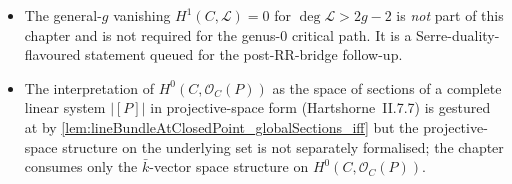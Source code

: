 \begin{itemize}
    chapter supplies the basis \((1, f)\) and stops.
  \item The general-\(g\) vanishing
    \(H^1(C, \mathcal L) = 0\) for \(\deg \mathcal L > 2g - 2\) is
    \emph{not} part of this chapter and is not required for the
    genus-\(0\) critical path. It is a Serre-duality-flavoured statement
    queued for the post-RR-bridge follow-up.
  \item The interpretation of \(H^0(C, \mathcal O_C(P))\) as the space
    of sections of a complete linear system \(|[P]|\) in
    projective-space form (Hartshorne~II.7.7) is gestured at by
    \cref{lem:lineBundleAtClosedPoint_globalSections_iff} but the
    projective-space structure on the underlying set is not separately
    formalised; the chapter consumes only the \(\bar k\)-vector space
    structure on \(H^0(C, \mathcal O_C(P))\).
\end{itemize}
